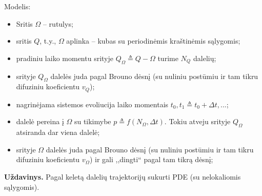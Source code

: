 \documentclass[10pt,a4paper]{article}
\begin{document}
Modelis:
\begin{itemize}
\item Sritis $\Omega$ – rutulys;
\item sritis $Q$, t.y.,    $\Omega$ aplinka – kubas su periodinėmis kraštinėmis sąlygomis;
\item pradiniu laiko momentu srityje $Q_\Omega \triangleq Q - \Omega$ turime $N_Q$ dalelių;
\item srityje $Q_\Omega$ dalelės juda pagal Brouno dėsnį (su nuliniu postūmiu ir tam tikru difuziniu koeficientu $v_Q$); 
\item nagrinėjama sistemos evoliucija  laiko momentais $t_0, t_1 \triangleq t_0 + \Delta t, ...$;
\item  dalelė pereina į $\Omega$ su tikimybe $p \triangleq f(N_\Omega, \Delta t)$. Tokiu atveju srityje   $Q_\Omega$ atsiranda dar viena dalelė; 
\item srityje $\Omega$ dalelės juda pagal Brouno dėsnį (su nuliniu postūmiu ir tam tikru difuziniu koeficientu $v_\Omega$) ir gali ,,dingti`` pagal tam tikrą dėsnį; 
\end{itemize}

\textbf{Uždavinys.}
Pagal keletą dalelių trajektorijų sukurti PDE (su nelokaliomis sąlygomis).




   
\end{document}
